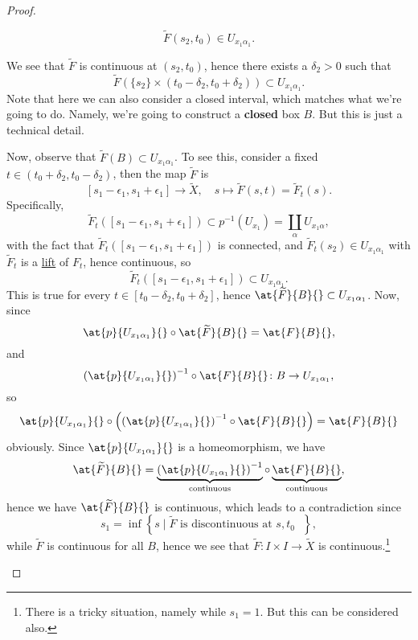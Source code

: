 \begin{proof}
\begin{enumerate}[(1)]
		      \[
			      \widetilde{F} (s_2, t_0)\in U_{x_1 \alpha _1}.
		      \]
		      \begin{figure}[H]
			      \centering
			      \label{fig:pf:col:lec14-8}
		      \end{figure}
		      We see that \(\widetilde{F} \) is continuous at \((s_2, t_0)\), hence there exists a \(\delta _2>0\) such that
		      \[
			      \widetilde{F} \left(\{s_2\}\times (t_0 - \delta _2, t_0 + \delta_2)\right)\subset U_{x_1\alpha _1}.
		      \]
		      Note that here we can also consider a closed interval, which matches what we're going to do. Namely, we're going to construct a
		      \textbf{closed} box \(B\). But this is just a technical detail.
		      \begin{figure}[H]
			      \centering
			      \label{fig:pf:col:lec14-9}
		      \end{figure}
		      Now, observe that \(\widetilde{F} (B)\subset U_{x_1 \alpha _1}\). To see this, consider a fixed \(t\in (t_0 + \delta _2, t_0 - \delta _2)\), then the map \(\widetilde{F} \) is
		      \[
			      [s_{1}-\epsilon _1, s_{1}+\epsilon _1]\to \widetilde{X} ,\quad s\mapsto \widetilde{F} (s, t) = \widetilde{F} _{t} (s).
		      \]
		      Specifically,
		      \[
			      \widetilde{F} _{t} ([s_{1}-\epsilon _1, s_{1}+\epsilon _1]) \subset p^{-1} (U_{x_1}) = \coprod\limits_{\alpha}U_{x_1 \alpha },
		      \]
		      with the fact that \(\widetilde{F} _{t} ([s_{1}-\epsilon _1, s_{1}+\epsilon _1])\) is connected, and \(\widetilde{F} _{t} (s_2)\in U_{x_1 \alpha _1}\) with
		      \(\widetilde{F} _t\) is a \hyperref[def:lift]{lift} of \(F_{t} \), hence continuous, so
		      \[
			      \widetilde{F} _{t} ([s_{1}-\epsilon _1, s_{1}+\epsilon _1])\subset U_{x_1 \alpha _1}.
		      \]
		      This is true for every \(t\in [t_0-\delta _2, t_0 + \delta _2]\), hence \(\at{\widetilde{F} }{B}{} \subset U_{x_1 \alpha _1}\). Now, since
		      \[
			      \at{p}{U_{x_1 \alpha _1}}{}\circ \at{\widetilde{F} }{B}{} = \at{F}{B}{},
		      \]
		      and
		      \[
			      \left(\at{p}{U_{x_1 \alpha _1}}{} \right)^{-1} \circ \at{F}{B}{} \colon B\to U_{x_1 \alpha _1},
		      \]
		      so
		      \[
			      \at{p}{U_{x_1 \alpha _1}}{} \circ \left(\left(\at{p}{U_{x_1 \alpha _1}}{} \right)^{-1} \circ \at{F}{B}{}\right) = \at{F}{B}{}
		      \]
		      obviously. Since \(\at{p}{U_{x_1 \alpha _1}}{}\) is a homeomorphism, we have
		      \[
			      \at{\widetilde{F} }{B}{} = \underbrace{\left(\at{p}{U_{x_1 \alpha _1}}{} \right)^{-1}}_{\text{continuous} } \circ \underbrace{\vphantom{\left(\at{p}{U_{x_1 \alpha _1}}{} \right)^{-1}}\at{F}{B}{}}_{\text{continuous} },
		      \]
		      hence we have \(\at{\widetilde{F} }{B}{} \) is continuous, which leads to a contradiction since
		      \[
			      s_1 = \inf \left\{s\mid \widetilde{F} \text{ is discontinuous at \(s, t_0\) } \right\},
		      \]
		      while \(\widetilde{F} \) is continuous for all \(B\), hence we see that \(\widetilde{F} :I\times I\to \widetilde{X} \) is continuous.\footnote{There is a tricky situation, namely while \(s_1 = 1\). But this can be considered also.}
	\end{enumerate}
\end{proof}
